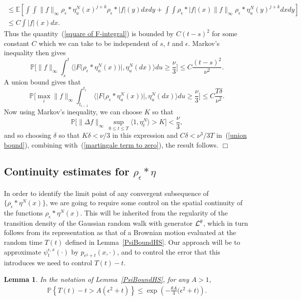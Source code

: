 \documentclass[12pt]{article}
\newenvironment {proof}{{\noindent\bf Proof }}{\hfill $\Box$ \medskip}
\newtheorem{lemma}[theorem]{Lemma}
\newcommand{\IP}{\mathbb P}
\newcommand{\IE}{\mathbb E}
\numberwithin{equation}{section}
\begin{document}
\begin{proof}
\begin{multline*}
	\\
	\leq
	\IE\left[\int\int\|f\|_\infty\rho_\epsilon*\eta_u^N(x)^{j+k}
	\rho_\epsilon*|f|(y)
	dx dy
+
	\int\int
	\rho_\epsilon*|f|(x)
	\|f\|_\infty
	\rho_\epsilon*\eta_u^N(y)^{j+k}
	dx dy \right]
	\\ \leq C\int |f|(x)dx.
\end{multline*}
Thus the quantity~(\ref{square of F-integral}) 
is bounded by $C(t-s)^2$ for some constant $C$ which we can 
take to be independent of $s$, $t$ and $\epsilon$. Markov's inequality 
then gives
\[
\IP\Big[\|f\|_\infty\int_s^t
\big\langle \big|F\big(\rho_\epsilon*\eta_u^N(x)\big)\big|,
\eta_u^N(dx)\big\rangle du \geq \frac{\nu}{3}\Big]
\leq C\frac{(t-s)^2}{\nu^2}.
\]
A union bound gives that
\begin{equation}
\label{union bound}
\IP\Big[\max_i\|f\|_\infty\int_{t_{i-1}}^{t_i}
\big\langle \big|F\big(\rho_\epsilon*\eta_u^N(x)\big)\big|,
\eta_u^N(dx)\big\rangle du \geq \frac{\nu}{3}\Big]
\leq C\frac{T\delta}{\nu^2}.
\end{equation}
Now using Markov's inequality, we can choose $K$ so that
\[
\IP\Big[\|\Delta f\|_\infty\, \sup_{0\leq t\leq T} \langle 1,\eta_t^N\rangle 
>K\Big]<\frac{\nu}{3}, 
\]
and so choosing $\delta$ so that $K\delta<\nu/3$ in this 
expression and $C\delta<\nu^3/3T$ in~(\ref{union bound}),
combining with~(\ref{martingale term to zero}), the result follows.
\end{proof}

\subsection{Continuity estimates for $\rho_\epsilon*\eta$}
\label{continuity for random walk}

In order to identify the limit point of any convergent subsequence
of $\{\rho_\epsilon*\eta^N(x)\}$, 
we are going to require some control on the spatial continuity of the 
functions $\rho_\epsilon*\eta^N(x)$. This will be inherited from the regularity
of the transition density of the 
Gaussian random walk with generator ${\cal L}^\theta$, which in turn follows
from its representation
as that of a Brownian motion evaluated at the random time $T(t)$ defined
in Lemma~\ref{PsiBoundHS}.
Our approach will be to 
approximate $\psi_t^{\epsilon,x}(\cdot)$ by $p_{\epsilon^2+t}(x, \cdot)$,
and to control the error that this introduces we 
need to control $T(t)-t$. 

\begin{lemma}
    \label{lem:poisson_ld}
    In the notation of Lemma~\ref{PsiBoundHS}, for any $A>1$,
    \begin{align*}
        \IP\left\{
            T(t) - t > A(\epsilon^2 + t)
        \right\}
    \le
	    \exp\left(-\frac{\theta A}{4}\big(\epsilon^2+t\big)
	    \right) .
    \end{align*}
\end{lemma}
\end{document}
